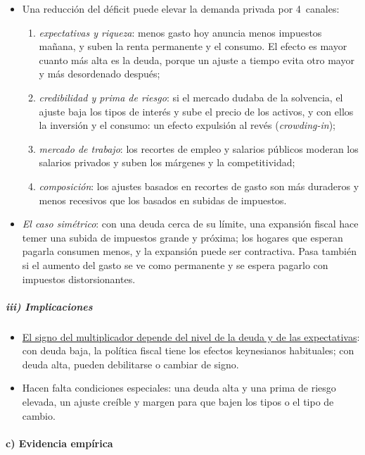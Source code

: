 \documentclass[11pt]{article}
\begin{document}
\begin{itemize}
\item Una reducción del déficit puede elevar la demanda privada por 4~canales:
  \begin{enumerate}
  \item \emph{expectativas y riqueza}: menos gasto hoy anuncia menos impuestos mañana, y suben la renta permanente y el consumo. El efecto es mayor cuanto más alta es la deuda, porque un ajuste a tiempo evita otro mayor y más desordenado después\nocite{BertolaDrazen1993Trigger};
  \item \emph{credibilidad y prima de riesgo}: si el mercado dudaba de la solvencia, el ajuste baja los tipos de interés y sube el precio de los activos, y con ellos la inversión y el consumo: un efecto expulsión al revés (\emph{crowding-in});
  \item \emph{mercado de trabajo}: los recortes de empleo y salarios públicos moderan los salarios privados y suben los márgenes y la competitividad\nocite{AlesinaPerotti1995Fiscal};
  \item \emph{composición}: los ajustes basados en recortes de gasto son más duraderos y menos recesivos que los basados en subidas de impuestos\nocite{AlesinaArdagna2010Large,AlesinaFaveroGiavazzi2019Austerity}.
  \end{enumerate}
\item \emph{El caso simétrico}: con una deuda cerca de su límite, una expansión fiscal hace temer una subida de impuestos grande y próxima; los hogares que esperan pagarla consumen menos, y la expansión puede ser contractiva\nocite{Sutherland1997Fiscal}. Pasa también si el aumento del gasto se ve como permanente y se espera pagarlo con impuestos distorsionantes.
\end{itemize}

\subparagraph{iii) Implicaciones}

\begin{itemize}
\item \uline{El signo del multiplicador depende del nivel de la deuda y de las expectativas}: con deuda baja, la política fiscal tiene los efectos keynesianos habituales; con deuda alta, pueden debilitarse o cambiar de signo.
\item Hacen falta condiciones especiales: una deuda alta y una prima de riesgo elevada\nocite{Perotti1999Fiscal}, un ajuste creíble y margen para que bajen los tipos o el tipo de cambio.
\end{itemize}

\paragraph{c) Evidencia empírica}
\end{document}
